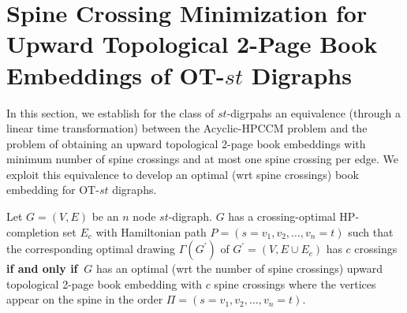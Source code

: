 \documentclass{myllncs-mixalis}
\newcommand{\eat}[1] {{}}
\begin{document}
\section{Spine Crossing Minimization for Upward Topological 2-Page Book Embeddings of OT-$st$
Digraphs}

In this section,  we establish for the class of $st$-digrpahs an
equivalence (through a linear time transformation) between the
Acyclic-HPCCM problem and the problem of obtaining an upward
topological 2-page book embeddings with minimum number of spine
crossings and at most one spine crossing per edge. We exploit this
equivalence to develop an optimal (wrt spine crossings) book
embedding for  OT-$st$ digraphs.

\eat{
\begin{lemma} An optimal upward topological  2-page book embedding of a rhombus
has exactly one spine crossing.
\end{lemma}
\begin{proof}
Note that a rhombus does not have a hamiltonian path and that it has
an optimal HP-completion set consisting of a single edge. Then, the
lemma, follows as a consequence of
Theorem~\ref{thm:BEequivHPcompletionSet}. \qed
\end{proof}
}

\begin{theorem}
\label{thm:BEequivHPcompletionSet} Let $G=(V,E)$ be an $n$ node
$st$-digraph. $G$ has a crossing-optimal   HP-completion set $E_c$
with Hamiltonian path $P=(s=v_1, v_2, \ldots, v_n=t)$ such that the
corresponding optimal drawing $\Gamma(G^\prime)$ of $G^\prime=(V,E
\cup E_c)$  has $c$ crossings \textbf{if and only if} $~G$ has an
optimal (wrt the number of spine crossings) upward topological
2-page book embedding with $c$ spine crossings where the vertices
appear on the spine in the order $\Pi=(s=v_1, v_2, \ldots, v_n=t)$.
\end{theorem}
\end{document}
